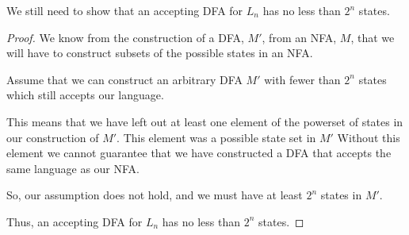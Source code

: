 \documentclass[12pt,letterpaper]{article}
\begin{document}
\begin{enumerate}
      We still need to show that an accepting DFA for $L_n$ has no less than $2^n$ states.

      \begin{proof}
        We know from the construction of a DFA, $M'$, from an NFA, $M$, that we will have to construct subsets of the possible states in an NFA.

        Assume that we can construct an arbitrary DFA $M'$ with fewer than $2^n$ states which still accepts our language.

        This means that we have left out at least one element of the powerset of states in our construction of $M'$.
        This element was a possible state set in $M'$
        Without this element we cannot guarantee that we have constructed a DFA that accepts the same language as our NFA.

        So, our assumption does not hold, and we must have at least $2^n$ states in $M'$.

        Thus, an accepting DFA for $L_n$ has no less than $2^n$ states.
      \end{proof}
  \end{enumerate}
\end{document}
